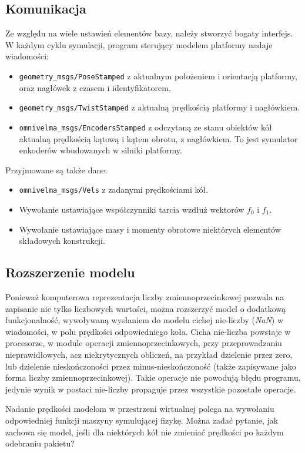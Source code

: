 	\subsection{Komunikacja}
		Ze względu na wiele ustawień elementów bazy, należy stworzyć bogaty interfejs.
		W każdym cyklu symulacji, program sterujący modelem platformy nadaje wiadomości:
		\begin{itemize}
		\item \texttt{geometry\_msgs/PoseStamped} z aktualnym położeniem i orientacją platformy, oraz nagłówek z czasem i identyfikatorem.
		\item \texttt{geometry\_msgs/TwistStamped} z aktualną prędkością platformy i nagłówkiem.
		\item \texttt{omnivelma\_msgs/EncodersStamped} z odczytaną ze stanu obiektów kół aktualną prędkością kątową i kątem obrotu, z nagłówkiem. 
		To jest symulator enkoderów wbudowanych w silniki platformy.
		\end{itemize}
		
		Przyjmowane są także dane:
		\begin{itemize}
		\item \texttt{omnivelma\_msgs/Vels} z zadanymi prędkościami kół.
		\item Wywołanie ustawiające współczynniki tarcia wzdłuż wektorów $f_0$ i $f_1$.
		\item Wywołanie ustawiające masy i momenty obrotowe niektórych elementów składowych konstrukcji.
		\end{itemize}

	\subsection{Rozszerzenie modelu}
		\label{sec:model_nan}
		Ponieważ komputerowa reprezentacja liczby zmiennoprzecinkowej pozwala na zapisanie nie tylko liczbowych wartości, można rozszerzyć model o dodatkową funkcjonalność,
		wywoływaną wysłaniem do modelu cichej nie-liczby (\emph{NaN}) w wiadomości, w polu prędkości odpowiedniego koła. 
		Cicha nie-liczba powstaje w procesorze, w module operacji zmiennoprzecinkowych, przy przeprowadzaniu nieprawidłowych, 
		acz niekrytycznych obliczeń, na przykład dzielenie przez zero, lub dzielenie nieskończoności przez minus-nieskończoność 
		(także zapisywane jako forma liczby zmiennoprzecinkowej).
		Takie operacje nie powodują błędu programu, jedynie wynik w postaci nie-liczby propaguje przez wszystkie pozostałe operacje.

		Nadanie prędkości modelom w przestrzeni wirtualnej polega na wywołaniu odpowiedniej funkcji maszyny symulującej fizykę.
		Można zadać pytanie, jak zachowa się model, jeśli dla niektórych kół nie zmieniać prędkości po każdym odebraniu pakietu?

